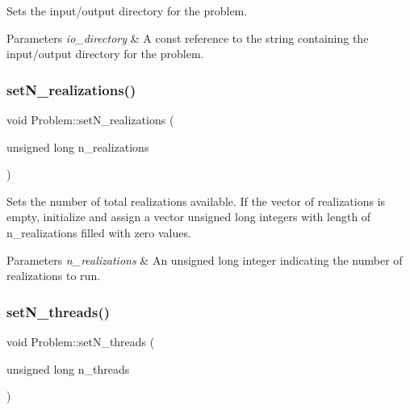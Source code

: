 Sets the input/output directory for the problem. 


\begin{DoxyParams}{Parameters}
{\em io\+\_\+directory} & A const reference to the string containing the input/output directory for the problem. \\
\hline
\end{DoxyParams}
\mbox{\label{classProblem_ae5cec2ad575abb95cf7304153c31e410}} 
\subsubsection{\texorpdfstring{set\+N\+\_\+realizations()}{setN\_realizations()}}
{\footnotesize\ttfamily void Problem\+::set\+N\+\_\+realizations (\begin{DoxyParamCaption}\item[{unsigned long}]{n\+\_\+realizations }\end{DoxyParamCaption})}



Sets the number of total realizations available. If the vector of realizations is empty, initialize and assign a vector unsigned long integers with length of n\+\_\+realizations filled with zero values. 


\begin{DoxyParams}{Parameters}
{\em n\+\_\+realizations} & An unsigned long integer indicating the number of realizations to run. \\
\hline
\end{DoxyParams}
\mbox{\label{classProblem_ad770920d19d5276fd0e30b835abe21ef}} 
\subsubsection{\texorpdfstring{set\+N\+\_\+threads()}{setN\_threads()}}
{\footnotesize\ttfamily void Problem\+::set\+N\+\_\+threads (\begin{DoxyParamCaption}\item[{unsigned long}]{n\+\_\+threads }\end{DoxyParamCaption})}



